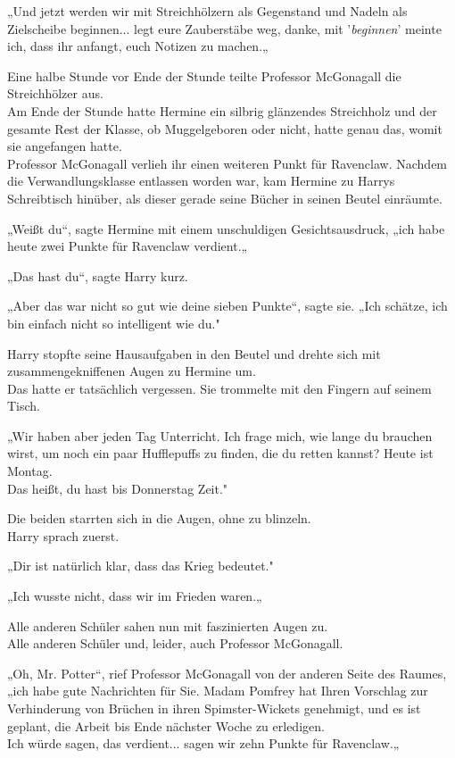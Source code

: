 {„Und jetzt werden wir mit Streichhölzern als Gegenstand und Nadeln als Zielscheibe beginnen... legt eure Zauberstäbe weg, danke, mit '\emph{beginnen}' meinte ich, dass ihr anfangt, euch Notizen zu machen.„

Eine halbe Stunde vor Ende der Stunde teilte Professor McGonagall die Streichhölzer aus.\\ Am Ende der Stunde hatte Hermine ein silbrig glänzendes Streichholz und der gesamte Rest der Klasse, ob Muggelgeboren oder nicht, hatte genau das, womit sie angefangen hatte.\\ Professor McGonagall verlieh ihr einen weiteren Punkt für Ravenclaw. Nachdem die Verwandlungsklasse entlassen worden war, kam Hermine zu Harrys Schreibtisch hinüber, als dieser gerade seine Bücher in seinen Beutel einräumte.

„Weißt du“, sagte Hermine mit einem unschuldigen Gesichtsausdruck, „ich habe heute zwei Punkte für Ravenclaw verdient.„

„Das hast du“, sagte Harry kurz.

„Aber das war nicht so gut wie deine sieben Punkte“, sagte sie. „Ich schätze, ich bin einfach nicht so intelligent wie du."

Harry stopfte seine Hausaufgaben in den Beutel und drehte sich mit zusammengekniffenen Augen zu Hermine um.\\ Das hatte er tatsächlich vergessen. Sie trommelte mit den Fingern auf seinem Tisch.

„Wir haben aber jeden Tag Unterricht. Ich frage mich, wie lange du brauchen wirst, um noch ein paar Hufflepuffs zu finden, die du retten kannst? Heute ist Montag.\\ Das heißt, du hast bis Donnerstag Zeit."

Die beiden starrten sich in die Augen, ohne zu blinzeln.\\ Harry sprach zuerst.

„Dir ist natürlich klar, dass das Krieg bedeutet."

„Ich wusste nicht, dass wir im Frieden waren.„

Alle anderen Schüler sahen nun mit faszinierten Augen zu.\\ Alle anderen Schüler und, leider, auch Professor McGonagall.

„Oh, Mr. Potter“, rief Professor McGonagall von der anderen Seite des Raumes,\\ „ich habe gute Nachrichten für Sie. Madam Pomfrey hat Ihren Vorschlag zur Verhinderung von Brüchen in ihren Spimster-Wickets genehmigt, und es ist geplant, die Arbeit bis Ende nächster Woche zu erledigen.\\ Ich würde sagen, das verdient... sagen wir zehn Punkte für Ravenclaw.„

}
